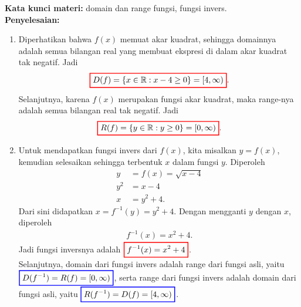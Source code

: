 \documentclass[10pt,openany,a4paper]{article}
\theoremstyle{definition}
\theoremstyle{definition}
\theoremstyle{plain}
\newenvironment{jawab}[2][tes]{
\textbf{Kata kunci materi:} #1.\\
\textbf{Penyelesaian:} #2
}{}
\begin{document}
\begin{enumerate}
    \begin{jawab}[domain dan range fungsi, fungsi invers]{
        \begin{enumerate}
            \item Diperhatikan bahwa $f(x)$ memuat akar kuadrat, sehingga domainnya adalah semua bilangan real yang membuat ekspresi di dalam akar kuadrat tak negatif. Jadi 
            \begin{align*}
                \colorlet{oldcolor}{.}
        \color{red}
        \setlength{\fboxrule}{1pt} \boxed{\color{oldcolor}D(f)=\{x \in \mathbb{R} : x-4 \geq 0\} = [4, \infty)}\color{oldcolor}.
            \end{align*}
            Selanjutnya, karena $f(x)$ merupakan fungsi akar kuadrat, maka range-nya adalah semua bilangan real tak negatif. Jadi
            \begin{align*}
                \colorlet{oldcolor}{.}
        \color{red}
        \setlength{\fboxrule}{1pt} \boxed{\color{oldcolor}R(f)=\{y \in \mathbb{R} : y \geq 0\} = [0, \infty)}\color{oldcolor}.
            \end{align*}
            \item Untuk mendapatkan fungsi invers dari $f(x)$, kita misalkan $y=f(x)$, kemudian selesaikan sehingga terbentuk $x$ dalam fungsi $y$. Diperoleh
            \begin{align*}
                y &= f(x) = \sqrt{x-4}\\
                y^2 &= x-4\\
                x &= y^2 + 4.
            \end{align*}
            Dari sini didapatkan $x = f^{-1}(y) = y^2 + 4$. Dengan mengganti $y$ dengan $x$, diperoleh
            \begin{align*}
                f^{-1}(x) = x^2 + 4.
            \end{align*}
            Jadi fungsi inversnya adalah $\colorlet{oldcolor}{.}
        \color{red}
        \setlength{\fboxrule}{1pt} \boxed{\color{oldcolor}f^{-1}(x) = x^2 + 4}\color{oldcolor}$.\\
        Selanjutnya, domain dari fungsi invers adalah range dari fungsi asli, yaitu $\colorlet{oldcolor}{.}
        \color{blue}
        \setlength{\fboxrule}{1pt} \boxed{\color{oldcolor}D(f^{-1}) = R(f) = [0, \infty)}\color{oldcolor}$, serta range dari fungsi invers adalah domain dari fungsi asli, yaitu $\colorlet{oldcolor}{.}
        \color{blue}
        \setlength{\fboxrule}{1pt} \boxed{\color{oldcolor}R(f^{-1}) = D(f) = [4, \infty)}\color{oldcolor}$.

\end{enumerate}}
\end{jawab}
\end{enumerate}
\end{document}
